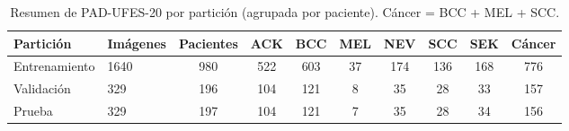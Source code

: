 \begin{table}[t]
\caption{Resumen de PAD-UFES-20 por partición (agrupada por paciente). Cáncer = BCC + MEL + SCC.}
\label{tab:data}
\centering
\begin{adjustbox}{max width=\linewidth}
\begin{tabular}{llcccccccc}
\toprule
Partición & Imágenes & Pacientes & ACK & BCC & MEL & NEV & SCC & SEK & Cáncer \\
\midrule
Entrenamiento & 1640 & 980 & 522 & 603 & 37 & 174 & 136 & 168 & 776 \\
Validación & 329 & 196 & 104 & 121 & 8 & 35 & 28 & 33 & 157 \\
Prueba & 329 & 197 & 104 & 121 & 7 & 35 & 28 & 34 & 156 \\
\bottomrule
\end{tabular}
\end{adjustbox}
\end{table}
